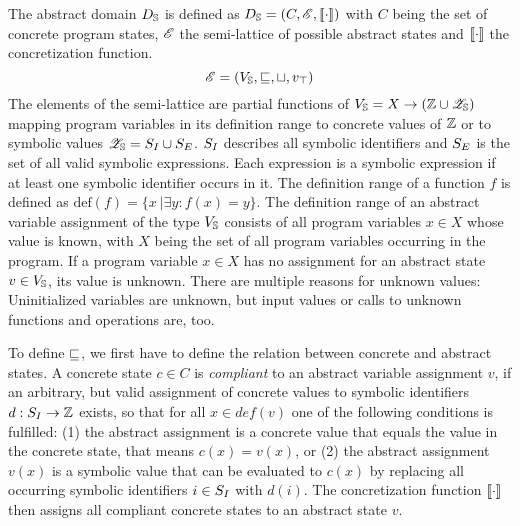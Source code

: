 The abstract domain $D_{\mathbb{S}}$ is defined as
$D_{\mathbb{S}} = (C, \mathscr{E}, [\![ \cdot ]\!] )$
with $C$ being the set of concrete program states, $\mathscr{E}$ the semi-lattice of possible abstract states and $[\![ \cdot ]\!]$ the concretization function.
\[\mathscr{E} = (V_{\mathbb{S}},
                  \sqsubseteq, 
                  \sqcup, 
                  v_\top
                )        
\]
The elements of the semi-lattice are partial functions of $V_{\mathbb{S}} = X \rightarrow (\mathbb{Z} \cup \mathscr{Z}_{\mathbb{S}})$ mapping program variables in its definition range to concrete values of $\mathbb{Z}$
or to symbolic values $\mathscr{Z}_{\mathbb{S}} = S_I \cup S_E$.
$S_I$ describes all symbolic identifiers and
$S_E$ is the set of all valid symbolic expressions. Each expression is a symbolic expression if at least one symbolic identifier occurs in it.
The definition range of a function $f$ is defined as $\text{def}(f) = \{x\ | \exists y: f(x) = y\}$. The definition range of an abstract variable assignment of the type $V_{\mathbb{S}}$ consists of all program variables $x \in X$ whose value is known, with $X$ being the set of all program variables occurring in the program.
If a program variable $x \in X$ has no assignment for an abstract state $v \in V_{\mathbb{S}}$, its value is unknown.
There are multiple reasons for unknown values: Uninitialized variables are unknown, but input values or calls to unknown functions and operations are, too.

To define $\sqsubseteq$, we first have to define the relation between concrete and abstract states.
A concrete state $c \in C$ is \emph{compliant} to an abstract variable assignment $v$, if an arbitrary, but valid assignment of concrete values to symbolic identifiers $d: S_I \rightarrow \mathbb{Z}$ exists, so that for all $x \in def(v)$ one of the following conditions is fulfilled:
(1) the abstract assignment is a concrete value that equals the value in the concrete state, that means $c(x) = v(x)$, or
(2) the abstract assignment $v(x)$ is a symbolic value that can be evaluated to $c(x)$ by replacing all occurring symbolic identifiers $i \in S_I$ with $d(i)$.
The concretization function $[\![ \cdot ]\!]$ then assigns all compliant concrete states to an abstract state $v$.

